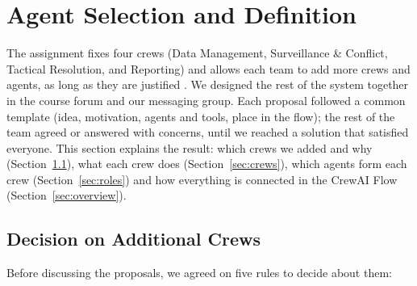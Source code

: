 \usetikzlibrary{shapes.geometric}
\providecommand{\fname}[1]{\nolinkurl{#1}}

\section{Agent Selection and Definition}
\label{sec:agents}

The assignment fixes four crews (Data Management, Surveillance \& Conflict, Tactical
Resolution, and Reporting) and allows each team to add more crews and agents, as long as they are justified \cite{mas_assignment}. We designed the rest of the system together in the course forum and our messaging group.
Each proposal followed a common template (idea, motivation, agents and tools, place in the flow); the rest of the team agreed or answered with concerns, until we reached a solution that satisfied everyone. This section explains the result: which crews we
added and why (Section~\ref{sec:extra-crews}), what each crew does
(Section~\ref{sec:crews}), which agents form each crew (Section~\ref{sec:roles}) and how
everything is connected in the CrewAI Flow (Section~\ref{sec:overview}).
\subsection{Decision on Additional Crews}
\label{sec:extra-crews}

Before discussing the proposals, we agreed on five rules to decide about them:


